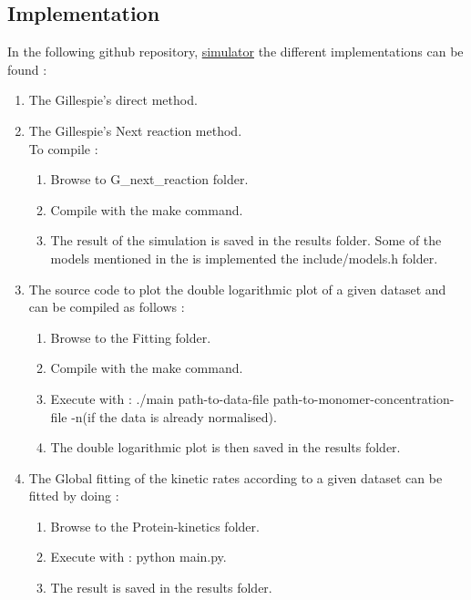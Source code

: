 \documentclass[11pt,a4paper]{article}
\begin{document}
\subsection{Implementation}
In the following github repository, \href{https://github.com/Prateeba/TRAN-F501-Internship-201819/tree/master/Code}{simulator} the different implementations can be found :
\begin{enumerate}
  \item The Gillespie's direct method.
  \item The Gillespie's Next reaction method. \\ To compile :
    \begin{enumerate}
      \item Browse to G\_next\_reaction folder.
      \item Compile with the make command.
      \item The result of the simulation is saved in the results folder.
      Some of the models mentioned in the \cite{meisl_molecular_2016} is implemented the include/models.h folder.
    \end{enumerate}
  \item The source code to plot the double logarithmic plot of a given dataset and can be compiled as follows :
    \begin{enumerate}
      \item Browse to the Fitting folder.
      \item Compile with the make command.
      \item Execute with : ./main path-to-data-file path-to-monomer-concentration-file -n(if the data is already normalised).
      \item The double logarithmic plot is then saved in the results folder.
    \end{enumerate}
  \item The Global fitting of the kinetic rates according to a given dataset can be fitted by doing :
    \begin{enumerate}
      \item Browse to the Protein-kinetics folder.
      \item Execute with  : python main.py.
      \item The result is saved in the results folder.
    \end{enumerate}
\end{enumerate}
\end{document}
